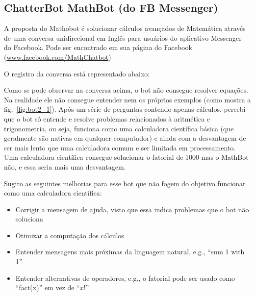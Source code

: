 \subsection{ChatterBot MathBot (do FB Messenger)}\label{subsec:bot2} 


A proposta do Mathobot é solucionar cálculos avançados de Matemática através de uma conversa unidirecional em Inglês para usuários do aplicativo Messenger do Facebook.
Pode ser encontrado em sua página do Facebook (\url{www.facebook.com/MathChatbot})

O registro da conversa está representado abaixo:



Como se pode observar na conversa acima, o bot não consegue resolver equações.
Na realidade ele não consegue entender nem os próprios exemplos (como mostra a fig.~\ref{fig:bot2_1}).
Após um série de perguntas contendo apenas cálculos, percebi que o bot só entende e resolve problemas relacionados à aritmética e trigonometria, ou seja, funciona como uma calculadora científica básica (que geralmente são nativas em qualquer computador) e ainda com a desvantagem de ser mais lento que uma calculadora comum e ser limitada em processamento. Uma calculadora científica consegue solucionar o fatorial de $1000$ mas o MathBot não, e essa seria mais uma desvantagem.

Sugiro as seguintes melhorias para esse bot que não fogem do objetivo funcionar como uma calculadora científica:
\begin{itemize}[noitemsep]
    \item Corrigir a mensagem de ajuda, visto que essa indica problemas que o bot não soluciona
    \item Otimizar a computação dos cálculos
    \item Entender mensagens mais próximas da linguagem natural, e.g., ``sum 1 with 1''
    \item Entender alternativas de operadores, e.g., o fatorial pode ser usado como ``fact(x)'' em vez de ``$x!$''
\end{itemize}